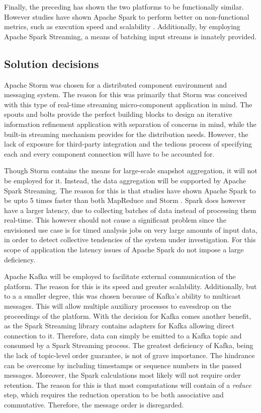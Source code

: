 Finally, the preceding has shown the two platforms to be functionally similar. However studies have shown Apache Spark to perform better on non-functional metrics, such as execution speed and scalability \cite{mapreduce_vs_spark}. Additionally, by employing Apache Spark Streaming, a means of batching input streams is innately provided.


\subsection{Solution decisions}
\label{sec:solution_decision}
Apache Storm was chosen for a distributed component environment and messaging system. The reason for this was primarily that Storm was conceived with this type of real-time streaming micro-component application in mind. The spouts and bolts provide the perfect building blocks to design an iterative information refinement application with separation of concerns in mind, while the built-in streaming mechanism provides for the distribution needs. However, the lack of exposure for third-party integration and the tedious process of specifying each and every component connection will have to be accounted for.

Though Storm contains the means for large-scale snapshot aggregation, it will not be employed for it. Instead, the data aggregation will be supported by Apache Spark Streaming. The reason for this is that studies have shown Apache Spark to be upto 5 times faster than both MapReduce \cite{mapreduce_vs_spark} and Storm \cite{spark_vs_storm}. Spark does however have a larger latency, due to collecting batches of data instead of processing them real-time. This however should not cause a significant problem since the envisioned use case is for timed analysis jobs on very large amounts of input data, in order to detect collective tendencies of the system under investigation. For this scope of application the latency issues of Apache Spark do not impose a large deficiency.

Apache Kafka will be employed to facilitate external communication of the platform. The reason for this is its speed and greater scalability. Additionally, but to a a smaller degree, this was chosen because of Kafka's ability to multicast messages. This will allow multiple auxiliary processes to eavesdrop on the proceedings of the platform. With the decision for Kafka comes another benefit, as the Spark Streaming library contains adapters for Kafka allowing direct connection to it. Therefore, data can simply be emitted to a Kafka topic and consumed by a Spark Streaming process. The greatest deficiency of Kafka, being the lack of topic-level order guarantee, is not of grave importance. The hindrance can be overcome by including timestamps or sequence numbers in the passed messages. Moreover, the Spark calculations most likely will not require order retention. The reason for this is that most computations will contain of a \emph{reduce} step, which requires the reduction operation to be both associative and commutative. Therefore, the message order is disregarded.

